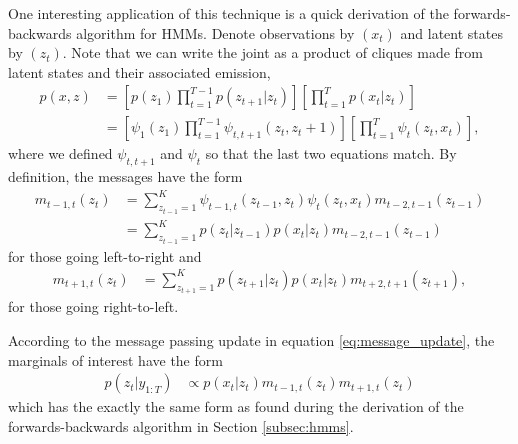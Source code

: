 One interesting application of this technique is a quick derivation of the
forwards-backwards algorithm for HMMs. Denote observations by $\left(x_t\right)$
and latent states by $\left(z_t\right)$. Note that we can write the joint as a
product of cliques made from latent states and their associated emission,
\begin{align*}
  p\left(x, z\right) &= \left[p\left(z_1\right) \prod_{t = 1}^{T - 1} p\left(z_{t + 1} \vert z_t\right)\right]
  \left[\prod_{t = 1}^{T} p\left(x_t \vert z_t\right)\right] \\
    &= \left[\psi_1\left(z_1\right)\prod_{t = 1}^{T - 1} \psi_{t, t + 1}\left(z_t, z_t +
    1\right)\right] \left[\prod_{t = 1}^{T} \psi_t\left(z_t, x_t\right)\right],
\end{align*}
where we defined $\psi_{t, t + 1}$ and $\psi_t$ so that the last two equations
match. By definition, the messages have the form
\begin{align*}
  m_{t - 1, t}\left(z_{t}\right) &= \sum_{z_{t - 1} = 1}^{K} \psi_{t - 1, t}\left(z_{t - 1}, z_t\right) \psi_{t}\left(z_t, x_t\right) m_{t - 2, t - 1}\left(z_{t - 1}\right) \\
  &= \sum_{z_{t - 1} = 1}^{K} p\left(z_t \vert z_{t - 1}\right)p\left(x_t \vert z_t\right)m_{t - 2, t - 1}\left(z_{t - 1}\right)
\end{align*}
for those going left-to-right and
\begin{align*}
  m_{t + 1, t}\left(z_t\right) &= \sum_{z_{t + 1} = 1}^{K} p\left(z_{t + 1}\vert z_t\right)p\left(x_t \vert z_t\right)m_{t + 2, t + 1}\left(z_{t + 1}\right),
\end{align*}
for those going right-to-left.

According to the message passing update in equation \ref{eq:message_update}, the
marginals of interest have the form
\begin{align*}
  p\left(z_{t} \vert y_{1:T}\right) &\propto p\left(x_t \vert z_t\right) m_{t - 1, t}\left(z_t\right)m_{t + 1, t}\left(z_t\right)
\end{align*}
which has the exactly the same form as found during the derivation of the
forwards-backwards algorithm in Section \ref{subsec:hmms}.


